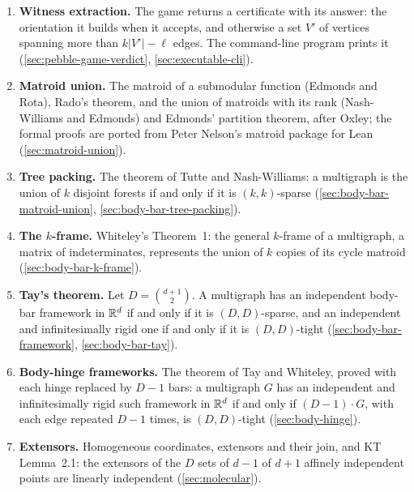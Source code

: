 \begin{enumerate}
        procedures that decide $(k,\ell)$-sparsity, $(k,\ell)$-tightness
        and the Laman property, and a command-line program that decides
        whether a graph read from a file is Laman
        (\cref{sec:executable}).
  \item \textbf{Witness extraction.} The game returns a certificate with
        its answer: the orientation it builds when it accepts, and
        otherwise a set $V'$ of vertices spanning more than
        $k|V'| - \ell$ edges. The command-line program prints it
        (\cref{sec:pebble-game-verdict}, \cref{sec:executable-cli}).
  \item \textbf{Matroid union.} The matroid of a submodular function
        (Edmonds and Rota), Rado's theorem, and the union of matroids with
        its rank (Nash-Williams and Edmonds) and Edmonds' partition
        theorem, after Oxley; the formal proofs are ported from Peter
        Nelson's matroid package for Lean (\cref{sec:matroid-union}).
  \item \textbf{Tree packing.} The theorem of Tutte and Nash-Williams: a
        multigraph is the union of $k$ disjoint forests if and only if it
        is $(k,k)$-sparse (\cref{sec:body-bar-matroid-union},
        \cref{sec:body-bar-tree-packing}).
  \item \textbf{The $k$-frame.} Whiteley's Theorem~1: the general
        $k$-frame of a multigraph, a matrix of indeterminates, represents
        the union of $k$ copies of its cycle matroid
        (\cref{sec:body-bar-k-frame}).
  \item \textbf{Tay's theorem.} Let $D = \binom{d+1}{2}$. A
        multigraph has an independent body-bar framework in ${\mathbb{R}}^d$ if and
        only if it is $(D,D)$-sparse, and an independent and
        infinitesimally rigid one if and only if it is $(D,D)$-tight
        (\cref{sec:body-bar-framework}, \cref{sec:body-bar-tay}).
  \item \textbf{Body-hinge frameworks.} The theorem of Tay and Whiteley,
        proved with each hinge replaced by $D - 1$ bars: a multigraph $G$
        has an independent and infinitesimally rigid such framework in
        ${\mathbb{R}}^d$ if and only if $(D-1)\cdot G$, with each edge repeated
        $D - 1$ times, is $(D,D)$-tight (\cref{sec:body-hinge}).
  \item \textbf{Extensors.} Homogeneous coordinates, extensors and their
        join, and KT Lemma~2.1: the extensors of the $D$ sets of $d - 1$
        of $d + 1$ affinely independent points are linearly independent
        (\cref{sec:molecular}).

\end{enumerate}
